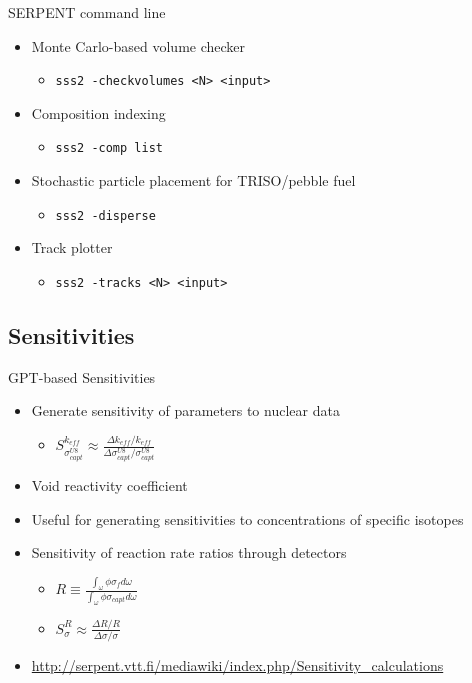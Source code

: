 \documentclass{beamer}
\begin{document}
\begin{frame}{SERPENT command line}
    \begin{itemize}
        \item Monte Carlo-based volume checker
        \begin{itemize}
            \item{\texttt{sss2 -checkvolumes <N> <input>}}
        \end{itemize}
        \item Composition indexing
        \begin{itemize}
            \item{\texttt{sss2 -comp list}}
        \end{itemize}
        \item Stochastic particle placement for TRISO/pebble fuel
        \begin{itemize}
            \item{\texttt{sss2 -disperse}}
        \end{itemize}
        \item Track plotter
        \begin{itemize}
            \item{\texttt{sss2 -tracks <N> <input>}}
        \end{itemize}
    \end{itemize}
\end{frame}

\subsection{Sensitivities}

\begin{frame}{GPT-based Sensitivities}
    \begin{itemize}
        \item Generate sensitivity of parameters to nuclear data
        \begin{itemize}
            \item $S^{k_{eff}}_{\sigma_{capt}^{U8}}\approx
                \frac{\Delta k_{eff}/k_{eff}}{\Delta\sigma^{U8}_{capt} / \sigma^{U8}_{capt}}$
        \end{itemize}
        \item Void reactivity coefficient
        \item Useful for generating sensitivities to concentrations of specific isotopes
        \item Sensitivity of reaction rate ratios through detectors
        \begin{itemize}
            \item $R\equiv \frac{\int_\omega\phi\sigma_fd\omega}{\int_\omega\phi\sigma_{capt}d\omega}$
            \item $S^R_\sigma\approx\frac{\Delta R/R}{\Delta\sigma /\sigma}$
        \end{itemize}
        \item \url{http://serpent.vtt.fi/mediawiki/index.php/Sensitivity\_calculations}
    \end{itemize}
\end{frame}
\end{document}
